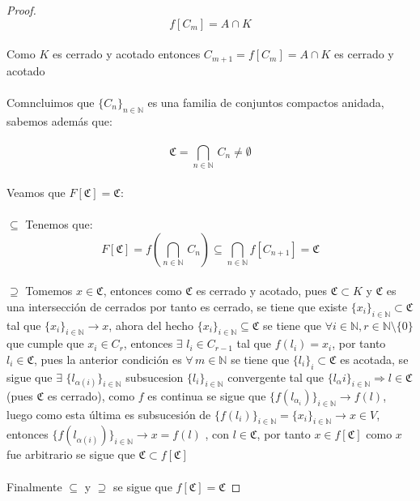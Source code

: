\documentclass[11pt,letterpaper]{article}
\newcommand{\N}{\mathbb{N}}
\begin{document}
\begin{proof}
\begin{equation*}
        f[C_m]=A\cap K
    \end{equation*}\,\\
    Como $K$ es cerrado y acotado entonces $C_{m+1}=f[C_m]=A\cap K$ es cerrado y acotado\,\\
    \newpage
    \,\\
    Comncluimos que $\{C_{n}\}_{n\in \N}$ es una familia de conjuntos compactos anidada, sabemos además que:\,\\
    \,\\
    \begin{equation*}
        \mathfrak{C} =\bigcap_{n\in \N}\,C_n\neq \emptyset
    \end{equation*}\,\\
    Veamos que $F[\mathfrak{C}]=\mathfrak{C} $:\,\\
    \,\\
    $\subseteq$\,\,Tenemos que:\,\\
    \begin{equation*}
        F[\mathfrak{C}]=f\left(\bigcap_{n\in \N}\,C_n\right)\subseteq \bigcap_{n\in \N} f[C_{n+1}]=\mathfrak{C} 
    \end{equation*}\,\\  
      $\supseteq $\,\,Tomemos $x\in \mathfrak{C} $, entonces como $\mathfrak{C}$ es cerrado y acotado, pues $\mathfrak{C}\subset K$ y $\mathfrak{C}$ es una intersecci\'on de cerrados por tanto es cerrado, se tiene que
      existe $\{x_i\}_{i\in \N}\subset \mathfrak{C} $ tal que $\{x_i\}_{i\in \N}\rightarrow x$, ahora del hecho $\{x_i\}_{i\in \N}\subseteq \mathfrak{C} $ se tiene que
      $\forall i \in \N,r\in \N\setminus \{0\}$ que cumple que $x_i\in C_{r}$, entonces $\exists\,\,l_i\in C_{r-1}$ tal que $f(l_i)=x_i$, por tanto $l_i\in \mathfrak{C} $, pues la anterior condici\'on es $\forall\,m\in \N$ se tiene que $\{l_i\}_i\subset \mathfrak{C} $ es acotada, se sigue que
      $\exists\,\,\{l_{\alpha(i)}\}_{i\in \N}$ subsucesion $\{l_i\}_{i\in \N}$ convergente tal que $\{l_\alpha{i}\}_{i\in \N}\Rightarrow l\in \mathfrak{C} $ (pues $\mathfrak{C} $ es cerrado), como $f$ es continua se sigue que $\{f(l_{\alpha_i})\}_{i\in \N}\rightarrow f(l)$, luego como esta \'ultima
      es subsucesi\'on de $\{f(l_i)\}_{i\in \N}=\{x_i\}_{i\in \N}\rightarrow x\in V$, entonces $\{f(l_{\alpha(i)})\}_{i\in \N}\rightarrow x=f(l)$ , con $l\in \mathfrak{C} $, por tanto $x\in f[\mathfrak{C} ]$ como $x$ fue arbitrario se sigue que $\mathfrak{C} \subset f[\mathfrak{C} ]$\,\\
      \,\\
      Finalmente $\subseteq $ y $\supseteq $ se sigue que $f[\mathfrak{C}]=\mathfrak{C}  $
\end{proof}
\end{document}

